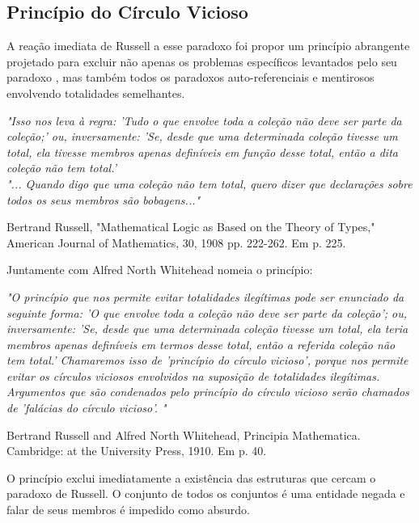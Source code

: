    \subsection{Princípio do Círculo Vicioso}
      A reação imediata de Russell a esse paradoxo foi propor um princípio 
      abrangente projetado para excluir não apenas os problemas específicos 
      levantados pelo seu paradoxo , mas também todos os paradoxos 
      auto-referenciais e mentirosos envolvendo totalidades semelhantes.
      \begin{Center}
         \textit{"Isso nos leva à regra: 'Tudo o que envolve toda a coleção 
         não deve ser parte da coleção;' ou, inversamente: 'Se, desde que uma 
         determinada coleção tivesse um total, ela tivesse membros apenas definíveis 
         em função desse total, então a dita coleção não tem total.'\\
         "... Quando digo que uma coleção não tem total, quero dizer que declarações 
         sobre todos os seus membros são bobagens..."}
         \begin{flushright}
            Bertrand Russell, "Mathematical Logic as Based on the Theory of Types,"\\ 
            American Journal of Mathematics, 30, 1908 pp. 222-262. Em p. 225.
         \end{flushright}
      \end{Center}
      Juntamente com Alfred North Whitehead nomeia o princípio:
      \begin{Center}
         \textit{"O princípio que nos permite evitar totalidades ilegítimas pode 
         ser enunciado da seguinte forma: 'O que envolve toda a coleção não deve 
         ser parte da coleção'; ou, inversamente: 'Se, desde que uma determinada 
         coleção tivesse um total, ela teria membros apenas definíveis em termos 
         desse total, então a referida coleção não tem total.' Chamaremos isso de 
         'princípio do círculo vicioso', porque nos permite evitar os círculos 
         viciosos envolvidos na suposição de totalidades ilegítimas. Argumentos 
         que são condenados pelo princípio do círculo vicioso serão chamados de 
         'falácias do círculo vicioso'. "}
         \begin{flushright}
            Bertrand Russell and Alfred North Whitehead, Principia Mathematica.\\
            Cambridge: at the University Press, 1910. Em p. 40.
         \end{flushright}
      \end{Center}
      O princípio exclui imediatamente a existência das estruturas que cercam o 
      paradoxo de Russell. O conjunto de todos os conjuntos é uma entidade negada e 
      falar de seus membros é impedido como absurdo.

